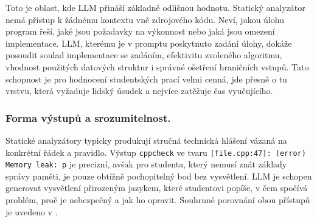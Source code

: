 Toto je oblast, kde LLM přináší základně odlišnou hodnotu.
Statický analyzátor nemá přístup k žádnému kontextu vně zdrojového kódu.
Neví, jakou úlohu program řeší, jaké jsou požadavky na výkonnost nebo jaká jsou omezení implementace.
LLM, kterému je v promptu poskytnuto zadání úlohy, dokáže posoudit soulad implementace se zadáním, efektivitu zvoleného algoritmu, vhodnost použitých datových struktur i správné ošetření hraničních vstupů.
Tato schopnost je pro hodnocení studentských prací velmi cenná, jde přesně o tu vrstvu, která vyžaduje lidský úsudek a nejvíce zatěžuje čas vyučujícího.

\subsubsection*{Forma výstupů a srozumitelnost.}
\label{subsubsec:output-format}

Statické analyzátory typicky produkují stručná technická hlášení vázaná na konkrétní řádek a pravidlo.
Výstup \texttt{cppcheck} ve tvaru \texttt{[file.cpp:47]: (error) Memory leak: p} je precizní, avšak pro studenta, který nemusí znát základy správy paměti, je pouze obtížně pochopitelný bod bez vysvětlení.
LLM je schopen generovat vysvětlení přirozeným jazykem, které studentovi popíše, v čem spočívá problém, proč je nebezpečný a jak ho opravit.
Souhrnné porovnání obou přístupů je uvedeno v .

